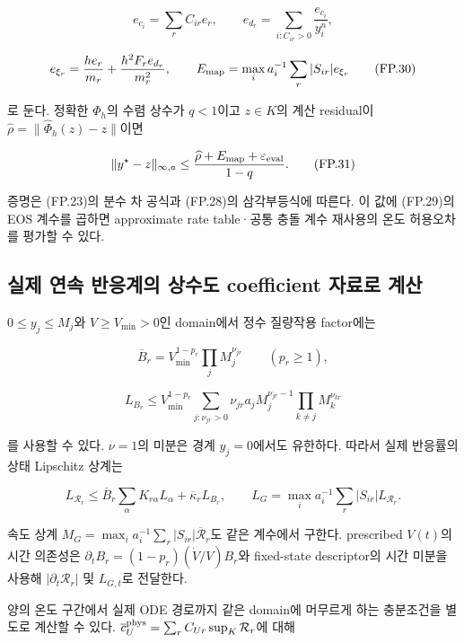 \documentclass[11pt,a4paper]{article}
\begin{document}
\[
e_{c_i}=\sum_rC_{ir}e_r,\qquad
e_{d_r}=\sum_{i:C_{ir}>0}\frac{e_{c_i}}{y_i^n},
\]

\[
e_{\xi_r}=\frac{h e_r}{m_r}
+\frac{h^2F_re_{d_r}}{m_r^2},\qquad
E_{\rm map}=\max_i a_i^{-1}\sum_r|S_{ir}|e_{\xi_r}
\tag{FP.30}
\]

로 둔다. 정확한 \(\Phi_h\)의 수렴 상수가 \(q<1\)이고 \(z\in K\)의 계산 residual이 \(\widehat\rho=\|\widehat\Phi_h(z)-z\|\)이면

\[
\|y^\star-z\|_{\infty,a}
\le\frac{\widehat\rho+E_{\rm map}+\varepsilon_{\rm eval}}{1-q}.
\tag{FP.31}
\]

증명은 (FP.23)의 분수 차 공식과 (FP.28)의 삼각부등식에 따른다. 이 값에 (FP.29)의 EOS 계수를 곱하면 approximate rate table·공통 충돌 계수 재사용의 온도 허용오차를 평가할 수 있다.

\hypertarget{uxc2e4uxc81c-uxc5f0uxc18d-uxbc18uxc751uxacc4uxc758-uxc0c1uxc218uxb3c4-coefficient-uxc790uxb8ccuxb85c-uxacc4uxc0b0}{%
\subsection{실제 연속 반응계의 상수도 coefficient 자료로 계산}\label{uxc2e4uxc81c-uxc5f0uxc18d-uxbc18uxc751uxacc4uxc758-uxc0c1uxc218uxb3c4-coefficient-uxc790uxb8ccuxb85c-uxacc4uxc0b0}}

\(0\le y_j\le M_j\)와 \(V\ge V_{\min}>0\)인 domain에서 정수 질량작용 factor에는

\[
\overline B_r
=
V_{\min}^{1-p_r}\prod_j M_j^{\nu_{jr}}
\qquad (p_r\ge1),
\]

\[
L_{B_r}
\le
V_{\min}^{1-p_r}
\sum_{j:\nu_{jr}>0}
\nu_{jr}a_j M_j^{\nu_{jr}-1}
\prod_{k\ne j}M_k^{\nu_{kr}}
\tag{FP.32}
\]

를 사용할 수 있다. \(\nu=1\)의 미분은 경계 \(y_j=0\)에서도 유한하다. 따라서 실제 반응률의 상태 Lipschitz 상계는

\[
L_{\mathcal R_r}
\le
\overline B_r\sum_\alpha K_{r\alpha}L_\alpha
+\overline\kappa_r L_{B_r},
\qquad
L_G=\max_i a_i^{-1}\sum_r|S_{ir}|L_{\mathcal R_r}.
\tag{FP.33}
\]

속도 상계 \(M_G=\max_i a_i^{-1}\sum_r|S_{ir}|\overline{\mathcal R}_r\)도 같은 계수에서 구한다. prescribed \(V(t)\)의 시간 의존성은 \(\partial_tB_r=(1-p_r)(\dot V/V)B_r\)와 fixed-state descriptor의 시간 미분을 사용해 \(|\partial_t\mathcal R_r|\) 및 \(L_{G,t}\)로 전달한다.

양의 온도 구간에서 실제 ODE 경로까지 같은 domain에 머무르게 하는 충분조건을 별도로 계산할 수 있다. \(\overline c_U^{\rm phys}=\sum_r C_{Ur}\sup_K\mathcal R_r\)에 대해
\end{document}
